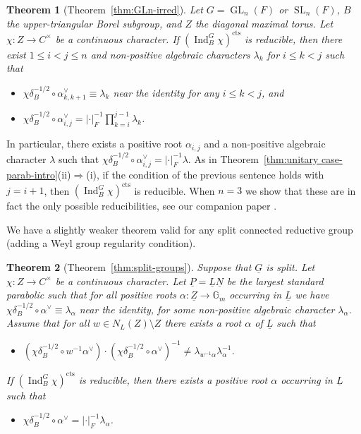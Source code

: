 \documentclass[a4paper]{amsart}
\numberwithin{equation}{section}
\newtheorem{thm}{Theorem}[section]
\theoremstyle{remark}
\theoremstyle{definition}
\DeclareMathOperator{\Ind}{Ind}
\DeclareMathOperator{\SL}{SL}
\DeclareMathOperator{\GL}{GL}
\newcommand{\alggrp}[1]{\underline{#1}}
\newcommand{\cts}{\mathrm{cts}}
\begin{document}
\begin{thm}[Theorem~\ref{thm:GLn-irred}]\label{thm:GLn-irred-intro}
  Let $G = \GL_{n}(F)$ or $\SL_{n}(F)$, $B$ the upper-triangular Borel subgroup, and $Z$ the diagonal maximal torus.
  Let $\chi\colon Z \to C^{\times}$ be a continuous character.
  If $(\Ind_{B}^{G}\chi)^{\cts}$ is reducible, then there exist $1\le i < j \le n$ and non-positive algebraic characters $\lambda_k$ for $i \le k < j$ such that 
  \begin{itemize}
  \item $\chi\delta_B^{-1/2} \circ \alpha_{k,k+1}^\vee \equiv \lambda_k$ near the identity for any $i \le k < j$, and
  \item $\chi\delta_B^{-1/2} \circ \alpha_{i,j}^\vee = \lvert \cdot\rvert_F^{-1}\prod_{k=i}^{j-1} \lambda_k$.
  \end{itemize}
\end{thm}

In particular, there exists a positive root $\alpha_{i,j}$ and a non-positive algebraic character $\lambda$ such that $\chi\delta_B^{-1/2} \circ \alpha_{i,j}^\vee = \lvert \cdot\rvert_F^{-1} \lambda$.
As in Theorem~\ref{thm:unitary case-parab-intro}(ii)$\Rightarrow$(i), if the condition of the previous sentence holds with $j = i+1$, then $(\Ind_{B}^{G}\chi)^{\cts}$ is reducible.
When $n = 3$ we show that these are in fact the only possible reducibilities, see our companion paper \cite{gl3}.


We have a slightly weaker theorem valid for any split connected reductive group (adding a Weyl group regularity condition).

\begin{thm}[Theorem~\ref{thm:split-groups}]\label{thm:split-groups-intro}
  Suppose that $\alggrp G$ is split.
  Let $\chi \colon Z \to C^{\times}$ be a continuous character.
  Let $\alggrp P = \alggrp L \alggrp N$ be the largest standard parabolic such that for all positive roots $\alpha \colon \alggrp Z \to \mathbb G_m$ occurring in $\alggrp L$ we have
  $\chi\delta_B^{-1/2} \circ \alpha^\vee \equiv \lambda_\alpha$ near the identity, for some non-positive algebraic character $\lambda_\alpha$.
  Assume that for all $w \in N_L(Z) \setminus Z$ there exists a root $\alpha$ of $\alggrp L$ such that
  \begin{itemize}
  \item $(\chi \delta_B^{-1/2} \circ w^{-1}\alpha^\vee)\cdot (\chi \delta_B^{-1/2} \circ \alpha^\vee)^{-1} \ne \lambda_{w^{-1}\alpha} \lambda_\alpha^{-1}$.
  \end{itemize}
  If $(\Ind_{B}^{G}\chi)^{\cts}$ is reducible, then there exists a positive root $\alpha$ occurring in $\alggrp L$ such that
  \begin{itemize}
  \item $\chi\delta_B^{-1/2} \circ \alpha^\vee = \lvert \cdot\rvert_F^{-1} \lambda_\alpha$.
  \end{itemize}
\end{thm}
\end{document}
